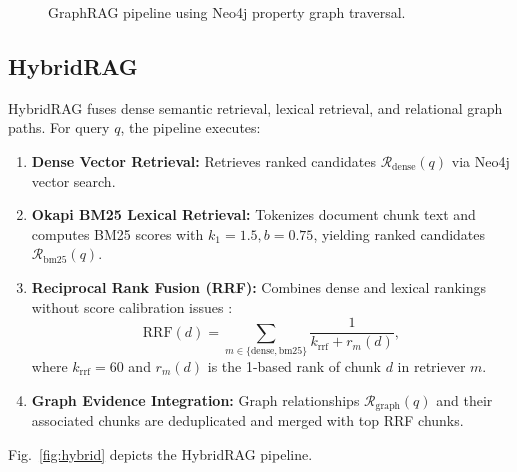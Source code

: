 \documentclass[conference]{IEEEtran}
\begin{document}
\begin{figure}[t]
\centering
{}
\caption{GraphRAG pipeline using Neo4j property graph traversal.}
\label{fig:graph}
\end{figure}

\subsection{HybridRAG}
\label{sec:hybrid}
HybridRAG fuses dense semantic retrieval, lexical retrieval, and relational graph paths. For query $q$, the pipeline executes:
\begin{enumerate}
\item \textbf{Dense Vector Retrieval:} Retrieves ranked candidates $\mathcal{R}_{\text{dense}}(q)$ via Neo4j vector search.
\item \textbf{Okapi BM25 Lexical Retrieval:} Tokenizes document chunk text and computes BM25 scores with $k_1 = 1.5, b = 0.75$, yielding ranked candidates $\mathcal{R}_{\text{bm25}}(q)$.
\item \textbf{Reciprocal Rank Fusion (RRF):} Combines dense and lexical rankings without score calibration issues \cite{cormack2009rrf}:
\begin{equation}
\text{RRF}(d) = \sum_{m \in \{\text{dense}, \text{bm25}\}} \frac{1}{k_{\text{rrf}} + r_m(d)},
\label{eq:rrf}
\end{equation}
where $k_{\text{rrf}} = 60$ and $r_m(d)$ is the 1-based rank of chunk $d$ in retriever $m$.
\item \textbf{Graph Evidence Integration:} Graph relationships $\mathcal{R}_{\text{graph}}(q)$ and their associated chunks are deduplicated and merged with top RRF chunks.
\end{enumerate}
Fig.~\ref{fig:hybrid} depicts the HybridRAG pipeline.
\end{document}
